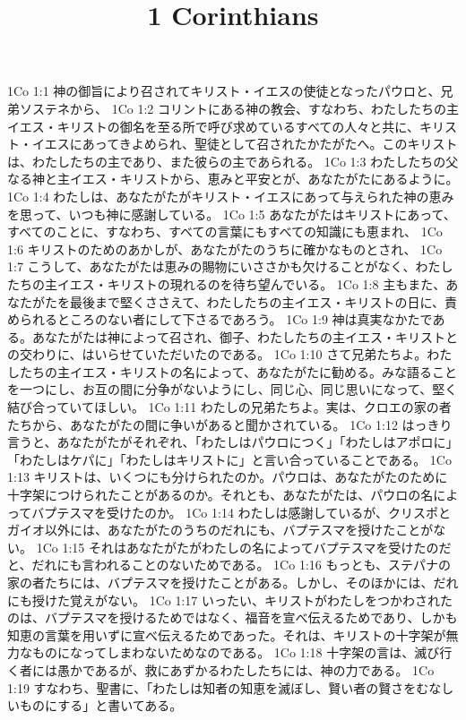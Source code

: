

\title{1 Corinthians}

1Co 1:1  神の御旨により召されてキリスト・イエスの使徒となったパウロと、兄弟ソステネから、
1Co 1:2  コリントにある神の教会、すなわち、わたしたちの主イエス・キリストの御名を至る所で呼び求めているすべての人々と共に、キリスト・イエスにあってきよめられ、聖徒として召されたかたがたへ。このキリストは、わたしたちの主であり、また彼らの主であられる。
1Co 1:3  わたしたちの父なる神と主イエス・キリストから、恵みと平安とが、あなたがたにあるように。
1Co 1:4  わたしは、あなたがたがキリスト・イエスにあって与えられた神の恵みを思って、いつも神に感謝している。
1Co 1:5  あなたがたはキリストにあって、すべてのことに、すなわち、すべての言葉にもすべての知識にも恵まれ、
1Co 1:6  キリストのためのあかしが、あなたがたのうちに確かなものとされ、
1Co 1:7  こうして、あなたがたは恵みの賜物にいささかも欠けることがなく、わたしたちの主イエス・キリストの現れるのを待ち望んでいる。
1Co 1:8  主もまた、あなたがたを最後まで堅くささえて、わたしたちの主イエス・キリストの日に、責められるところのない者にして下さるであろう。
1Co 1:9  神は真実なかたである。あなたがたは神によって召され、御子、わたしたちの主イエス・キリストとの交わりに、はいらせていただいたのである。
1Co 1:10  さて兄弟たちよ。わたしたちの主イエス・キリストの名によって、あなたがたに勧める。みな語ることを一つにし、お互の間に分争がないようにし、同じ心、同じ思いになって、堅く結び合っていてほしい。
1Co 1:11  わたしの兄弟たちよ。実は、クロエの家の者たちから、あなたがたの間に争いがあると聞かされている。
1Co 1:12  はっきり言うと、あなたがたがそれぞれ、「わたしはパウロにつく」「わたしはアポロに」「わたしはケパに」「わたしはキリストに」と言い合っていることである。
1Co 1:13  キリストは、いくつにも分けられたのか。パウロは、あなたがたのために十字架につけられたことがあるのか。それとも、あなたがたは、パウロの名によってバプテスマを受けたのか。
1Co 1:14  わたしは感謝しているが、クリスポとガイオ以外には、あなたがたのうちのだれにも、バプテスマを授けたことがない。
1Co 1:15  それはあなたがたがわたしの名によってバプテスマを受けたのだと、だれにも言われることのないためである。
1Co 1:16  もっとも、ステパナの家の者たちには、バプテスマを授けたことがある。しかし、そのほかには、だれにも授けた覚えがない。
1Co 1:17  いったい、キリストがわたしをつかわされたのは、バプテスマを授けるためではなく、福音を宣べ伝えるためであり、しかも知恵の言葉を用いずに宣べ伝えるためであった。それは、キリストの十字架が無力なものになってしまわないためなのである。
1Co 1:18  十字架の言は、滅び行く者には愚かであるが、救にあずかるわたしたちには、神の力である。
1Co 1:19  すなわち、聖書に、「わたしは知者の知恵を滅ぼし、賢い者の賢さをむなしいものにする」と書いてある。
